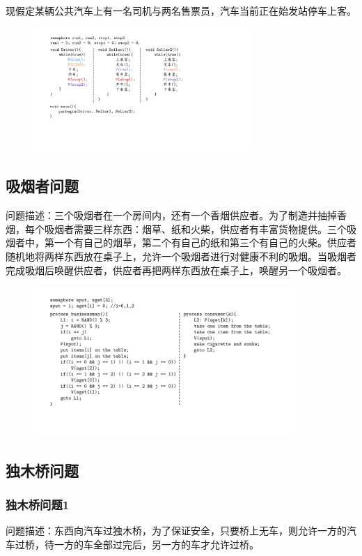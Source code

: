 \documentclass[cs4size,a4paper,10pt]{ctexart}
\begin{document}
	现假定某辆公共汽车上有一名司机与两名售票员，汽车当前正在始发站停车上客。

	\begin{figure}[H]
		\centering
		\includegraphics[width=0.75\textwidth]{img/售票问题.pdf}
	\end{figure}

	\subsection{吸烟者问题}
	问题描述：三个吸烟者在一个房间内，还有一个香烟供应者。为了制造并抽掉香烟，每个吸烟者需要三样东西：烟草、纸和火柴，供应者有丰富货物提供。三个吸烟者中，第一个有自己的烟草，第二个有自己的纸和第三个有自己的火柴。供应者随机地将两样东西放在桌子上，允许一个吸烟者进行对健康不利的吸烟。当吸烟者完成吸烟后唤醒供应者，供应者再把两样东西放在桌子上，唤醒另一个吸烟者。

	\begin{figure}[H]
		\centering
		\includegraphics[width=0.9\textwidth]{img/吸烟者问题.pdf}
	\end{figure}

	\subsection{独木桥问题}
	\subsubsection{独木桥问题1}
	问题描述：东西向汽车过独木桥，为了保证安全，只要桥上无车，则允许一方的汽车过桥，待一方的车全部过完后，另一方的车才允许过桥。
\end{document}
